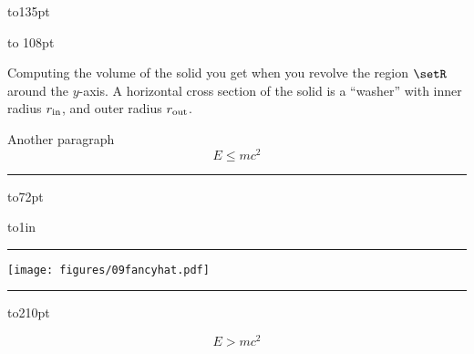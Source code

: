 \documentclass[openany,reqno]{amsbook}
\begin{document}
\graphicspath{{figures/}}

  \hbox to135pt
  {%
	  \parindent1pc%
	  \sffamily\small%
	      \vbox to 108pt{%
	      Computing the volume of the solid you get when you revolve the
	      region $\setR$ around the $y$-axis.  A horizontal cross section
	      of the solid is a ``washer'' with inner radius $r_{\rm in}$, and
	      outer radius $r_{\rm out}$.
	
	      Another paragraph
	      \[
	      E\leq mc^2
	      \]
	    \hrule}
	    
	    \vbox to72pt{}
	    
	    \vbox to1in{\hrule%
	    
	    \texttt{[image: figures/09fancyhat.pdf]} 
	    
	    \hrule}
  }%
  \hbox to210pt{
    
  }
\[
E>mc^2
\]
\end{document}
